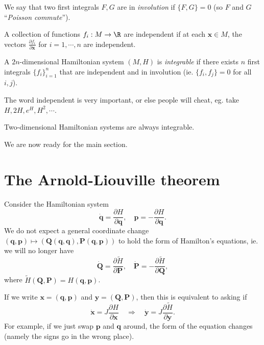 \documentclass[a4paper]{article}
\begin{document}
\begin{defi}[Involution]
  We say that two first integrals $F, G$ are in \emph{involution} if $\{F, G\} = 0$ (so $F$ and $G$ ``\emph{Poisson commute}'').
\end{defi}

\begin{defi}
  A collection of functions $f_i: M \to \R$ are independent if at each $\mathbf{x} \in M$, the vectors $\frac{\partial f_i}{\partial \mathbf{x}}$ for $i = 1, \cdots, n$ are independent.
\end{defi}

\begin{defi}
  A $2n$-dimensional Hamiltonian system $(M, H)$ is \emph{integrable} if there exists $n$ first integrals $\{f_i\}_{i = 1}^n$ that are independent and in involution (ie. $\{f_i, f_j\} = 0$ for all $i, j$).
\end{defi}
The word independent is very important, or else people will cheat, eg. take $H, 2H, e^H, H^2, \cdots$.

\begin{cor}
  Two-dimensional Hamiltonian systems are always integrable.
\end{cor}

We are now ready for the main section.
\section{The Arnold-Liouville theorem}
Consider the Hamiltonian system
\[
  \dot{\mathbf{q}} = \frac{\partial H}{\partial \mathbf{q}},\quad \mathbf{p} = -\frac{\partial H}{\partial \mathbf{q}}.
\]
We do not expect a general coordinate change $(\mathbf{q}, \mathbf{p}) \mapsto (\mathbf{Q}(\mathbf{q}, \mathbf{q}), \mathbf{P}(\mathbf{q}, \mathbf{p}))$ to hold the form of Hamilton's equations, ie. we will no longer have
\[
  \dot{\mathbf{Q}} = \frac{\partial \tilde{H}}{\partial \mathbf{P}},\quad \dot{\mathbf{P}} = -\frac{\partial \tilde{H}}{\partial \mathbf{Q}},
\]
where $\tilde{H}(\mathbf{Q}, \mathbf{P}) = H(\mathbf{q}, \mathbf{p})$.

If we write $\mathbf{x} = (\mathbf{q}, \mathbf{p})$ and $\mathbf{y} = (\mathbf{Q}, \mathbf{P})$, then this is equivalent to asking if
\[
  \dot{\mathbf{x}} = J \frac{\partial H}{\partial \mathbf{x}} \quad\Rightarrow\quad \dot{\mathbf{y}} = J \frac{\partial \tilde{H}}{ \partial \mathbf{y}}.
\]
For example, if we just swap $\mathbf{p}$ and $\mathbf{q}$ around, the form of the equation changes (namely the signs go in the wrong place).
\end{document}
